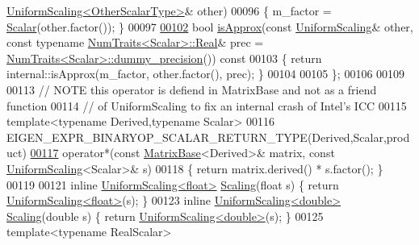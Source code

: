 \begin{DoxyCode}
      \hyperlink{class_eigen_1_1_uniform_scaling}{UniformScaling<OtherScalarType>}& other)
00096   \{ m\_factor = \hyperlink{class_eigen_1_1_uniform_scaling_a04c4339f58f1210c5d4d34b1bd7ae283}{Scalar}(other.factor()); \}
00097 
\hyperlink{class_eigen_1_1_uniform_scaling_a7f736fdbe43f7bce3d277312efdc315e}{00102}   \textcolor{keywordtype}{bool} \hyperlink{class_eigen_1_1_uniform_scaling_a7f736fdbe43f7bce3d277312efdc315e}{isApprox}(\textcolor{keyword}{const} \hyperlink{class_eigen_1_1_uniform_scaling}{UniformScaling}& other, \textcolor{keyword}{const} \textcolor{keyword}{typename} 
      \hyperlink{group___core___module_struct_eigen_1_1_num_traits}{NumTraits<Scalar>::Real}& prec = 
      \hyperlink{group___core___module_struct_eigen_1_1_num_traits}{NumTraits<Scalar>::dummy\_precision}())\textcolor{keyword}{ const}
00103 \textcolor{keyword}{  }\{ \textcolor{keywordflow}{return} internal::isApprox(m\_factor, other.factor(), prec); \}
00104 
00105 \};
00106 
00109 
00113 \textcolor{comment}{// NOTE this operator is defiend in MatrixBase and not as a friend function}
00114 \textcolor{comment}{// of UniformScaling to fix an internal crash of Intel's ICC}
00115 \textcolor{keyword}{template}<\textcolor{keyword}{typename} Derived,\textcolor{keyword}{typename} Scalar>
00116 EIGEN\_EXPR\_BINARYOP\_SCALAR\_RETURN\_TYPE(Derived,Scalar,product)
\hyperlink{class_eigen_1_1_uniform_scaling_ga8f79e131479dbe709ee1173b1be9a8f0}{00117} operator*(const \hyperlink{group___core___module_class_eigen_1_1_matrix_base}{MatrixBase}<Derived>& matrix, const \hyperlink{class_eigen_1_1_uniform_scaling}{UniformScaling}<Scalar>& s)
00118 \{ \textcolor{keywordflow}{return} matrix.derived() * s.factor(); \}
00119 
00121 \textcolor{keyword}{inline} \hyperlink{class_eigen_1_1_uniform_scaling}{UniformScaling<float>} \hyperlink{group___geometry___module_ga23a8ed57e3f2973526026765ae697761}{Scaling}(\textcolor{keywordtype}{float} s) \{ \textcolor{keywordflow}{return} 
      \hyperlink{class_eigen_1_1_uniform_scaling}{UniformScaling<float>}(s); \}
00123 \textcolor{keyword}{inline} \hyperlink{class_eigen_1_1_uniform_scaling}{UniformScaling<double>} \hyperlink{group___geometry___module_ga23a8ed57e3f2973526026765ae697761}{Scaling}(\textcolor{keywordtype}{double} s) \{ \textcolor{keywordflow}{return} 
      \hyperlink{class_eigen_1_1_uniform_scaling}{UniformScaling<double>}(s); \}
00125 \textcolor{keyword}{template}<\textcolor{keyword}{typename} RealScalar>

\end{DoxyCode}
